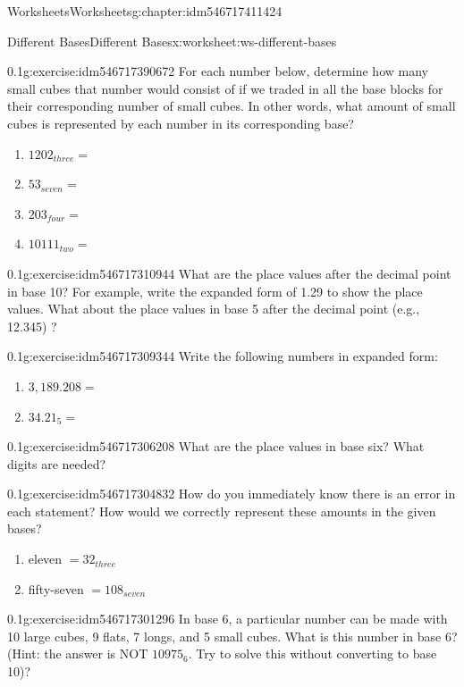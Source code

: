 \documentclass[twoside,11pt,]{book}
\begin{document}
\begin{chapterptx}{Worksheets}{}{Worksheets}{}{}{g:chapter:idm546717411424}
\begin{worksheet-section-numberless}{Different Bases}{}{Different Bases}{}{}{x:worksheet:ws-different-bases}
\begin{divisionexercise}{1}{}{0.1}{g:exercise:idm546717390672}
For each number below, determine how many small cubes that number would consist of if we traded in all the base blocks for their corresponding number of small cubes.  In other words, what amount of small cubes is represented by each number in its corresponding base?%
%
\begin{enumerate}[label=(\alph*)]
\item{}\(1202_{three}   = \)%
\item{}\(53_{seven}       = \)%
\item{}\(203_{four}       = \)%
\item{}\(10111_{two}       = \)%
\end{enumerate}
\end{divisionexercise}%
\begin{divisionexercise}{2}{}{0.1}{g:exercise:idm546717310944}%
What are the place values after the decimal point in base 10? For example, write the expanded form of 1.29 to show the place values. What about the place values in base 5 after the decimal point (e.g., 12.345) ?%
\end{divisionexercise}%
\begin{divisionexercise}{3}{}{0.1}{g:exercise:idm546717309344}%
Write the following numbers in expanded form:%
%
\begin{enumerate}[label=(\alph*)]
\item{}\(3,189.208 = \)%
\item{}\(34.21_5      = \)%
\end{enumerate}
\end{divisionexercise}%
\begin{divisionexercise}{4}{}{0.1}{g:exercise:idm546717306208}%
What are the place values in base six?  What digits are needed?%
\end{divisionexercise}%
\begin{divisionexercise}{5}{}{0.1}{g:exercise:idm546717304832}%
How do you immediately know there is an error in each statement?  How would we correctly represent these amounts in the given bases?%
%
\begin{enumerate}[label=(\alph*)]
\item{}eleven \(= 32_{three}\)%
\item{}fifty-seven \(= 108_{seven}\)%
\end{enumerate}
\end{divisionexercise}%
\begin{divisionexercise}{6}{}{0.1}{g:exercise:idm546717301296}%
In base 6, a particular number can be made with 10 large cubes, 9 flats, 7 longs, and 5 small cubes.  What is this number in base 6? (Hint: the answer is NOT \(10975_6 \). Try to solve this without converting to base 10)?%

\end{divisionexercise}
\end{worksheet-section-numberless}
\end{chapterptx}
\end{document}
